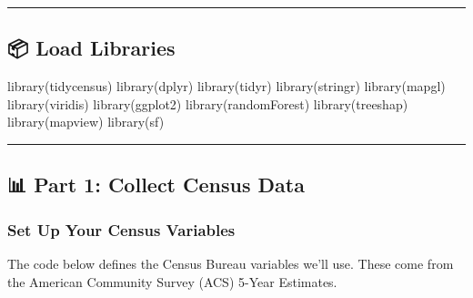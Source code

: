 \documentclass[
  letterpaper,
  DIV=11,
  numbers=noendperiod]{scrartcl}
\newenvironment{Shaded}{\begin{snugshade}}{\end{snugshade}}
\newcommand{\FunctionTok}[1]{\textcolor[rgb]{0.28,0.35,0.67}{#1}}
\newcommand{\NormalTok}[1]{\textcolor[rgb]{0.00,0.23,0.31}{#1}}
\begin{document}
\begin{center}\rule{0.5\linewidth}{0.5pt}\end{center}

\subsection{📦 Load Libraries}\label{load-libraries}

\begin{Shaded}
\begin{Highlighting}[]
\FunctionTok{library}\NormalTok{(tidycensus)}
\FunctionTok{library}\NormalTok{(dplyr)}
\FunctionTok{library}\NormalTok{(tidyr)}
\FunctionTok{library}\NormalTok{(stringr)}
\FunctionTok{library}\NormalTok{(mapgl)}
\FunctionTok{library}\NormalTok{(viridis)}
\FunctionTok{library}\NormalTok{(ggplot2)}
\FunctionTok{library}\NormalTok{(randomForest)}
\FunctionTok{library}\NormalTok{(treeshap)}
\FunctionTok{library}\NormalTok{(mapview)}
\FunctionTok{library}\NormalTok{(sf)}
\end{Highlighting}
\end{Shaded}

\begin{center}\rule{0.5\linewidth}{0.5pt}\end{center}

\subsection{📊 Part 1: Collect Census
Data}\label{part-1-collect-census-data}

\subsubsection{Set Up Your Census
Variables}\label{set-up-your-census-variables}

The code below defines the Census Bureau variables we'll use. These come
from the American Community Survey (ACS) 5-Year Estimates.
\end{document}
